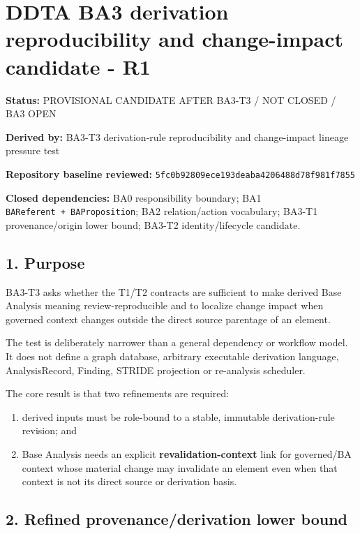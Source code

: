 \documentclass[11pt,a4paper]{article}
\providecommand{\tightlist}{\setlength{\itemsep}{0pt}\setlength{\parskip}{0pt}}
\begin{document}
\section{DDTA BA3 derivation reproducibility and change-impact candidate
-
R1}\label{ddta-ba3-derivation-reproducibility-and-change-impact-candidate---r1}

\textbf{Status:} PROVISIONAL CANDIDATE AFTER BA3-T3 / NOT CLOSED / BA3
OPEN

\textbf{Derived by:} BA3-T3 derivation-rule reproducibility and
change-impact lineage pressure test

\textbf{Repository baseline reviewed:}
\texttt{5fc0b92809ece193deaba4206488d78f981f7855}

\textbf{Closed dependencies:} BA0 responsibility boundary; BA1
\texttt{BAReferent\ +\ BAProposition}; BA2 relation/action vocabulary;
BA3-T1 provenance/origin lower bound; BA3-T2 identity/lifecycle
candidate.

\subsection{1. Purpose}\label{purpose}

BA3-T3 asks whether the T1/T2 contracts are sufficient to make derived
Base Analysis meaning review-reproducible and to localize change impact
when governed context changes outside the direct source parentage of an
element.

The test is deliberately narrower than a general dependency or workflow
model. It does not define a graph database, arbitrary executable
derivation language, AnalysisRecord, Finding, STRIDE projection or
re-analysis scheduler.

The core result is that two refinements are required:

\begin{enumerate}
\def\labelenumi{\arabic{enumi}.}
\tightlist
\item
  derived inputs must be role-bound to a stable, immutable
  derivation-rule revision; and
\item
  Base Analysis needs an explicit \textbf{revalidation-context} link for
  governed/BA context whose material change may invalidate an element
  even when that context is not its direct source or derivation basis.
\end{enumerate}

\subsection{2. Refined provenance/derivation lower
bound}\label{refined-provenancederivation-lower-bound}
\end{document}
